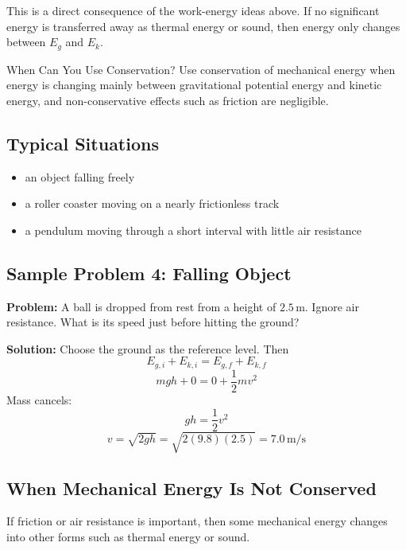 This is a direct consequence of the work-energy ideas above. If no significant energy is transferred away as thermal energy or sound, then energy only changes between $E_g$ and $E_k$.

\begin{keyidea}{When Can You Use Conservation?}
Use conservation of mechanical energy when energy is changing mainly between gravitational potential energy and kinetic energy, and non-conservative effects such as friction are negligible.
\end{keyidea}

\subsection{Typical Situations}
\begin{itemize}
    \item an object falling freely
    \item a roller coaster moving on a nearly frictionless track
    \item a pendulum moving through a short interval with little air resistance
\end{itemize}

\subsection*{Sample Problem 4: Falling Object}
\textbf{Problem:} A ball is dropped from rest from a height of $2.5\,\text{m}$. Ignore air resistance. What is its speed just before hitting the ground?

\textbf{Solution:}
Choose the ground as the reference level. Then
\begin{equation*}
    E_{g,i} + E_{k,i} = E_{g,f} + E_{k,f}
\end{equation*}
\begin{equation*}
    mgh + 0 = 0 + \frac{1}{2}mv^2
\end{equation*}
Mass cancels:
\begin{equation*}
    gh = \frac{1}{2}v^2
\end{equation*}
\begin{equation*}
    v = \sqrt{2gh} = \sqrt{2(9.8)(2.5)} = 7.0\,\text{m/s}
\end{equation*}

\subsection{When Mechanical Energy Is Not Conserved}
If friction or air resistance is important, then some mechanical energy changes into other forms such as thermal energy or sound.

